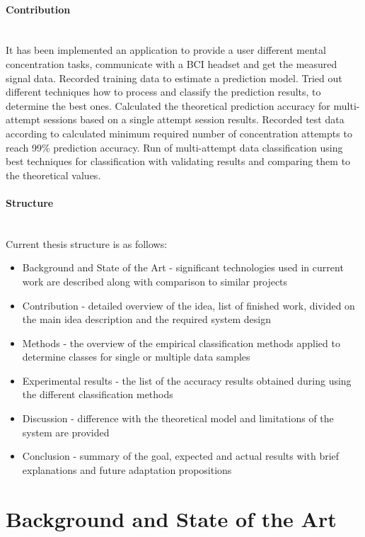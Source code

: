 \documentclass[12pt]{article}
\theoremstyle{definition}
\begin{document}
\paragraph{Contribution}~\\

It has been implemented an application to provide a user different mental concentration tasks, communicate with a BCI headset and get the measured signal data. Recorded training data to estimate a prediction model. Tried out different techniques how to process and classify the prediction results, to determine the best ones. Calculated the theoretical prediction accuracy for multi-attempt sessions based on a single attempt session results. Recorded test data according to calculated minimum required number of concentration attempts to reach 99\% prediction accuracy. Run of multi-attempt data classification using best techniques for classification with validating results and comparing them to the theoretical values.
\paragraph{Structure}~\\
Current thesis structure is as follows:

\begin{itemize}
\item Background and State of the Art - significant technologies used in current work are described along with comparison to similar projects
\item Contribution - detailed overview of the idea, list of finished work, divided on the  main idea description and the required system design
\item Methods - the overview of the empirical classification methods applied to determine classes for single or multiple data samples
\item Experimental results - the list of the accuracy results obtained during using the different classification methods
\item Discussion - difference with the theoretical model and limitations of the system are provided
\item Conclusion - summary of the goal, expected and actual results with brief explanations and future adaptation propositions
\end{itemize}

\newpage
\section{Background and State of the Art} 
\end{document}

